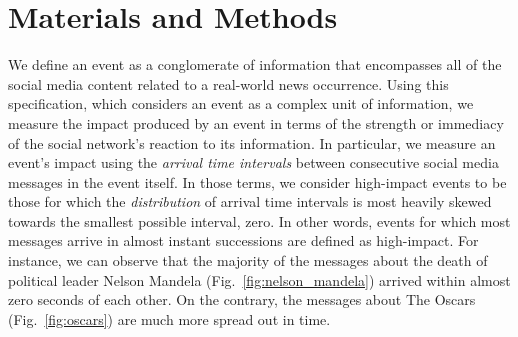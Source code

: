 \documentclass[10pt,letterpaper]{article}
\begin{document}
\section*{Materials and Methods}

We define an event as a conglomerate of information that encompasses
all of the social media content related to a real-world news
occurrence. Using this specification, which considers an event as a
complex unit of information, we measure the impact produced by an
event in terms of the strength or immediacy of the social network's
reaction to its information.  In particular, we measure an event's
impact using the \emph{arrival time intervals} between consecutive
social media messages in the event itself.
In those terms, we consider high-impact events to be those for which
the \emph{distribution} of arrival time intervals is most heavily
skewed towards the smallest possible interval, zero. In other words,
events for which most messages arrive in almost instant successions
are defined as high-impact.
For instance, we can observe that the majority of the messages about
the death of political leader Nelson Mandela
(Fig.~\ref{fig:nelson_mandela}) arrived within almost zero seconds of
each other. On the contrary, the messages about The Oscars
(Fig.~\ref{fig:oscars}) are much more spread out in time.
\end{document}

